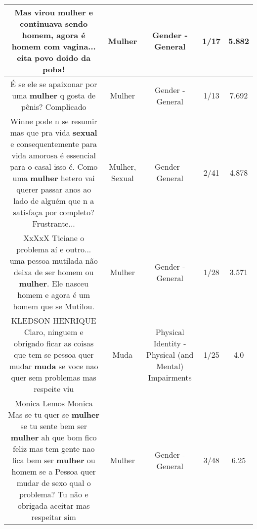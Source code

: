 \documentclass[11pt]{article}
\newlength\mylength
\begin{document}
\begin{center}
\begin{longtable}{|C{.65\mylength}|C{.30\mylength}|C{.12\mylength}|C{.12\mylength}|C{.12\mylength}|}
  \small Mas virou \textbf{mulher} e continuava sendo homem, agora é homem com vagina... eita povo doido da poha!\normalsize   & Mulher & Gender - General & 1/17 & 5.882 \\  \hline
  \small É se ele se apaixonar por uma \textbf{mulher} q gosta de pênis?  Complicado\normalsize   & Mulher & Gender - General & 1/13 & 7.692 \\  \hline
  \small Winne pode n se resumir mas que pra vida \textbf{sexual} e consequentemente para vida amorosa é essencial para o casal isso é. Como uma \textbf{mulher} hetero vai querer passar anos ao lado de alguém que n a satisfaça por completo?  Frustrante...\normalsize   & Mulher, Sexual & Gender - General & 2/41 & 4.878 \\  \hline
  \small XxXxX Ticiane o problema aí e outro... uma pessoa mutilada não deixa de ser homem ou \textbf{mulher}. Ele nasceu homem e agora é um homem que se Mutilou.\normalsize   & Mulher & Gender - General & 1/28 & 3.571 \\  \hline
  \small KLEDSON HENRIQUE Claro, ninguem e obrigado ficar as coisas que tem se pessoa quer mudar \textbf{muda} se voce nao quer sem problemas mas respeite viu\normalsize   & Muda & Physical Identity - Physical (and Mental) Impairments & 1/25 & 4.0 \\  \hline
  \small Monica Lemos Monica Mas se tu quer se \textbf{mulher} se tu sente bem ser \textbf{mulher} ah que bom fico feliz mas tem gente nao fica bem ser \textbf{mulher} ou homem se a Pessoa quer mudar de sexo qual o problema? Tu não e obrigada aceitar mas respeitar sim\normalsize   & Mulher & Gender - General & 3/48 & 6.25 \\  \hline

\end{longtable}
\end{center}
\end{document}
